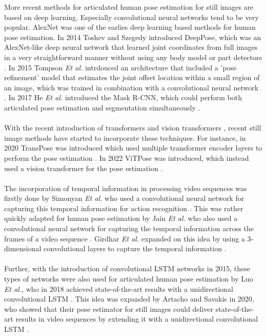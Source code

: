 \documentclass[./main.tex]{subfiles}
\begin{document}
More recent methods for articulated human pose estimation for still images are based on deep learning. Especially convolutional neural networks \cite{lecun1995convolutional} tend to be very popular. AlexNet \cite{krizhevsky2017imagenet} was one of the earlies deep learning based methods for human pose estimation. In 2014 Toshev and Szegedy introduced DeepPose, which was an AlexNet-like deep neural network that learned joint coordinates from full images in a very straightforward manner without using any body model or part detectors \cite{Toshev_2014, Chen_2020}. In 2015 Tompson \textit{Et al.} intrdouced an architecture that included a 'pose refinement' model that estimates the joint offset location within a small region of an image, which was trained in combination with a convolutional neural network \cite{tompson2015efficient}. In 2017 He \textit{Et al.} introduced the Mask R-CNN, which could perform both articulated pose estimation and segmentation simultaneously \cite{https://doi.org/10.48550/arxiv.1703.06870}.
\\
\\
With the recent introduction of transformers \cite{https://doi.org/10.48550/arxiv.1706.03762} and vision transformers \cite{dosovitskiy2021image}, recent still image methods have started to incorporate these techniques. For instance, in 2020 TransPose was introduced which used multiple transformer encoder layers to perform the pose estimation \cite{https://doi.org/10.48550/arxiv.2012.14214}. In 2022 ViTPose was introduced, which instead used a vision transformer for the pose estimation \cite{https://doi.org/10.48550/arxiv.2204.12484}.
\\
\\
The incorporation of temporal information in processing video sequences was firstly done by Simonyan \textit{Et al.} who used a convolutional neural network for capturing this temporal information for action recognition \cite{simonyan2014twostream}. This was rather quickly adapted for human pose estimation by Jain \textit{Et al.} who also used a convolutional neural network for capturing the temporal information across the frames of a video sequence \cite{https://doi.org/10.48550/arxiv.1506.02897, jain2014modeep}. Girdhar \textit{Et al.} expanded on this idea by using a 3-dimensional convolutional layers to capture the temporal information \cite{https://doi.org/10.48550/arxiv.1712.09184}.
\\
\\
Further, with the introduction of convolutional LSTM networks \cite{conv_lstm} in 2015, these types of networks were also used for articulated human pose estimation by Luo \textit{Et al.}, who in 2018 achieved state-of-the-art results with a unidirectional convolutional LSTM \cite{https://doi.org/10.48550/arxiv.1712.06316}. This idea was expanded by Artacho and Savakis in 2020, who showed that their pose estimator for still images could deliver state-of-the-art results in video sequences by extending it with a unidirectional convolutional LSTM \cite{https://doi.org/10.48550/arxiv.2001.08095}.
\end{document}
